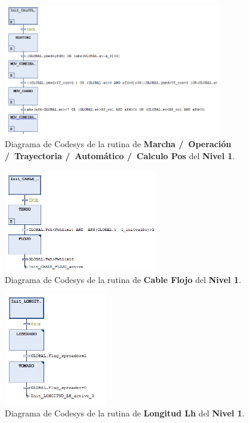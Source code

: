 \documentclass[11pt]{article}
\begin{document}
\begin{figure}
	\centering
	\includegraphics[width=0.85\textwidth]{images/codesys_nivel_1_marcha_operacion_trayectoria_automatico_calculo_pos.png}
	\caption{Diagrama de Codesys de la rutina de \textbf{Marcha /\ Operación /\ Trayectoria /\ Automático /\ Calculo Pos} del \textbf{Nivel 1}.}
	\label{fig:codesys_nivel_1_marcha_operacion_trayectoria_automatico_calculo_pos}
\end{figure}

\begin{figure}
	\centering
	\includegraphics[width=0.6\textwidth]{images/codesys_nivel_1_cable_flojo.png}
	\caption{Diagrama de Codesys de la rutina de \textbf{Cable Flojo} del \textbf{Nivel 1}.}
	\label{fig:codesys_nivel_1_cable_flojo}
\end{figure}

\begin{figure}
	\centering
	\includegraphics[width=0.4\textwidth]{images/codesys_nivel_1_longitud_lh.png}
	\caption{Diagrama de Codesys de la rutina de \textbf{Longitud Lh} del \textbf{Nivel 1}.}
	\label{fig:codesys_nivel_1_longitud_lh}
\end{figure}
\end{document}
